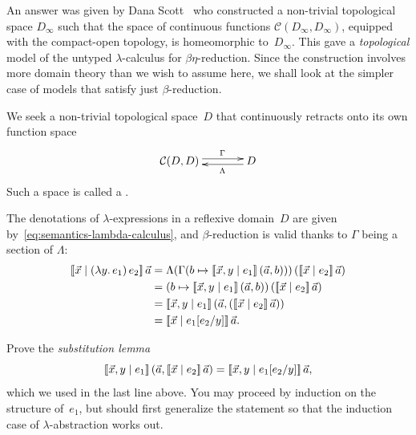 An answer was given by Dana Scott~ who
constructed a non-trivial topological space $D_\infty$ such that the
space of continuous functions $\mathcal{C}(D_\infty, D_\infty)$,
equipped with the compact-open topology, is homeomorphic
to~$D_\infty$. This gave a \emph{topological} model of the untyped
$\lambda$-calculus for $\beta\eta$-reduction. Since the construction
involves more domain theory than we wish to assume here, we shall look
at the simpler case of models that satisfy just $\beta$-reduction.

We seek a non-trivial topological space~$D$ that continuously retracts onto its own function space
%
\begin{equation}
  \label{eq:section-retraction-D}
  \xymatrix{
    **[l]{\mathcal{C}(D, D)}
    \ar@<+0.25em>[r]^{\Gamma}
    &
    {D}
    \ar@<+0.25em>[l]^{\Lambda}
  }
\end{equation}
%
Such a space is called a .


The denotations of $\lambda$-expressions in a reflexive domain~$D$ are given by~\eqref{eq:semantics-lambda-calculus}, and $\beta$-reduction is valid thanks to $\Gamma$ being a section of $\Lambda$:
%
\begin{align*}
  \sem{\vec{x} \ctx (\lam{y} e_1) \, e_2} \, \vec{a}
  &= \Lambda(\Gamma(b \mapsto \sem{\vec{x}, y \ctx e_1} \, (\vec{a}, b))) 
     \, (\sem{\vec{x} \ctx e_2} \, \vec{a}) \\
  &= (b \mapsto \sem{\vec{x}, y \ctx e_1} \, (\vec{a}, b))
     \, (\sem{\vec{x} \ctx e_2} \, \vec{a}) \\
  &= \sem{\vec{x}, y \ctx e_1} \, (\vec{a}, (\sem{\vec{x} \ctx e_2} \, \vec{a})) \\
  &= \sem{\vec{x} \ctx \subst{e_1}{e_2/y}} \, \vec{a}.
\end{align*}

\begin{exercise}
  Prove the \emph{substitution lemma}
  \begin{equation*}
    [\![\vec{x}, y \mid e_1]\!] \, (\vec{a}, [\![\vec{x} \mid e_2]\!] \, \vec{a}) =
    [\![\vec{x}, y \mid e_1[e_2/y]]\!] \, \vec{a},
  \end{equation*}
  which we used in the last line above. You may proceed by induction on the structure of~$e_1$, but should first generalize the statement so that the induction case of $\lambda$-abstraction works out.
\end{exercise}

